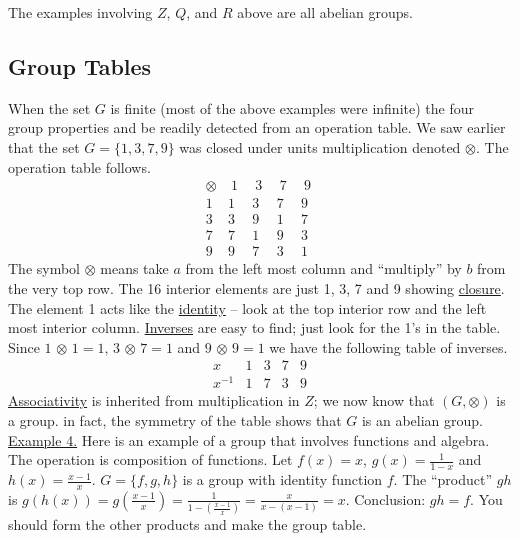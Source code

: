 \documentclass[12pt]{book}
\theoremstyle{definition}
\begin{document}
The examples involving $Z,\, Q$, and $R$ above are all abelian groups.

\subsection{Group Tables}
\rule{0in}{.1in}
When the set $G$ is finite (most of the above examples were infinite) the four group properties and be readily detected from an operation table. We saw earlier that the set $G=\{1,3,7,9\}$ was closed under units multiplication denoted $\otimes$.  The operation table follows.
$$\begin{array}{c|cccc}
\otimes & ~1~& ~3~ & ~7~ & ~9~\\
\hline
1 & 1 & 3 & 7 & 9\\
3 & 3 & 9 & 1 & 7\\
7 & 7 & 1 & 9 & 3\\
9 & 9 & 7 & 3 & 1
\end{array}$$
The symbol $\otimes$ means take $a$ from the left most column and ``multiply'' by $b$ from the very top row.  The 16 interior elements are just 1, 3, 7 and 9 showing \underline{closure}.  The element 1 acts like the \underline{identity}  -- look at the top interior row and the left most interior column.  \underline{Inverses} are easy to find;  just look for the 1's in the table.  Since $1\,\otimes\, 1=1,\,3\,\otimes\,7=1$ and  $9\,\otimes\,9=1$ we have the following table of inverses.
$$\begin{array}{c|cccc}
x & 1 & 3 & 7 & 9\\
\hline
x^{-1} & 1 & 7 & 3 & 9
\end{array}$$
\underline{Associativity} is inherited from multiplication in $Z$; we now know that $(G,\otimes)$ is a group.  in fact, the symmetry of the table shows that $G$ is an abelian group.\\[.1in]
\underline{Example 4.}  Here is an example of a group that involves functions and algebra.  The operation is composition of functions.  Let $f(x)=x$, $g(x)=\frac{1}{1-x}$ and $h(x)=\frac{x-1}{x}$.  $G=\{f,g,h\}$ is a group with identity function $f$.  The ``product'' $gh$ is $g(h(x))=g(\frac{x-1}{x})=\frac{1}{1-(\frac{x-1}{x})}=\frac{x}{x-(x-1)}=x$.  Conclusion: $gh=f$.  You should form the other products and make the group table.\\%
\end{document}

